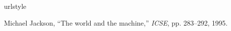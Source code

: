 \begin{thebibliography}{5}
\providecommand{\natexlab}[1]{#1}
\providecommand{\url}[1]{{#1}}
\providecommand{\urlprefix}{URL }
\expandafter\ifx\csname urlstyle\endcsname\relax
  \providecommand{\doi}[1]{DOI~\discretionary{}{}{}#1}\else
  \providecommand{\doi}{DOI~\discretionary{}{}{}\begingroup
  \urlstyle{rm}\Url}\fi
\providecommand{\eprint}[2][]{\url{#2}}

Michael Jackson, ``{The world and the machine},'' {\em ICSE}, pp. 283--292, 1995.




\end{thebibliography}




